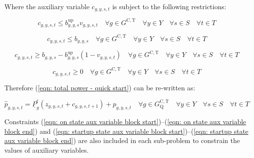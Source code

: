 \documentclass{article}
\newcommand{\sGeneratorsCandidateThermal}{G^{\mathrm{C,T}}}
\newcommand{\sYears}{Y}
\newcommand{\sScenarios}{S}
\newcommand{\sIntervals}{T}
\newcommand{\sGeneratorsCandidateThermalQuickStart}{G^{\mathrm{C,T}}_\mathrm{Q}}
\newcommand{\iGenerator}{g}
\newcommand{\iYear}{y}
\newcommand{\iScenario}{s}
\newcommand{\iInterval}{t}
\newcommand{\cPowerOutputMin}[1][\iGenerator]{\underline{P}_{#1}}
\newcommand{\cPowerOutputMinProportion}{\cPowerOutputMin^{\mathrm{f}}}
\newcommand{\vStartupIndicator}[1][\iGenerator,\iYear,\iScenario,\iInterval]{v_{#1}}
\newcommand{\vPower}[1][\iGenerator,\iYear,\iScenario,\iInterval]{p_{#1}}
\newcommand{\vPowerTotal}[1][\iGenerator,\iYear,\iScenario,\iInterval]{\hat{p}_{#1}}
\newcommand{\vInstalledCapacityTotalScenario}[1][\iGenerator,\iYear,\iScenario]{b_{#1}}
\newcommand{\vInstalledCapacityOnStateAux}[1][\iGenerator,\iYear,\iScenario,\iInterval]{z_{#1}}
\newcommand{\vInstalledCapacityStartupStateAux}[1][\iGenerator,\iYear,\iScenario,\iInterval]{c_{#1}}
\begin{document}
Where the auxiliary variable $\vInstalledCapacityStartupStateAux$ is subject to the following restrictions:

\begin{equation}
	\vInstalledCapacityStartupStateAux \leq \vInstalledCapacityTotalScenario^{\mathrm{up}} \vStartupIndicator \quad \forall \iGenerator \in \sGeneratorsCandidateThermal \quad \forall \iYear \in \sYears \quad \forall \iScenario \in \sScenarios \quad \forall \iInterval \in \sIntervals
	\label{eqn: startup state aux variable block start}
\end{equation}

\begin{equation}
	\vInstalledCapacityStartupStateAux \leq \vInstalledCapacityTotalScenario \quad \forall \iGenerator \in \sGeneratorsCandidateThermal \quad \forall \iYear \in \sYears \quad \forall \iScenario \in \sScenarios \quad \forall \iInterval \in \sIntervals
\end{equation}

\begin{equation}
	\vInstalledCapacityStartupStateAux \geq \vInstalledCapacityTotalScenario - \vInstalledCapacityTotalScenario^{\mathrm{up}} \left(1 - \vStartupIndicator \right) \quad \forall \iGenerator \in \sGeneratorsCandidateThermal \quad \forall \iYear \in \sYears \quad \forall \iScenario \in \sScenarios \quad \forall \iInterval \in \sIntervals
\end{equation}

\begin{equation}
	\vInstalledCapacityStartupStateAux \geq 0 \quad \forall \iGenerator \in \sGeneratorsCandidateThermal \quad \forall \iYear \in \sYears \quad \forall \iScenario \in \sScenarios \quad \forall \iInterval \in \sIntervals
	\label{eqn: startup state aux variable block end}
\end{equation}

Therefore (\ref{eqn: total power - quick start}) can be re-written as:

\begin{equation}
	\vPowerTotal = \cPowerOutputMinProportion \left(\vInstalledCapacityOnStateAux + \vInstalledCapacityStartupStateAux[\iGenerator,\iYear,\iScenario,\iInterval+1]\right) + \vPower \quad \forall \iGenerator \in \sGeneratorsCandidateThermalQuickStart \quad \forall \iYear \in \sYears \quad \forall \iScenario \in \sScenarios \quad \forall \iInterval \in \sIntervals
\end{equation}

Constraints (\ref{eqn: on state aux variable block start})--(\ref{eqn: on state aux variable block end}) and (\ref{eqn: startup state aux variable block start})--(\ref{eqn: startup state aux variable block end}) are also included in each sub-problem to constrain the values of auxiliary variables.
\end{document}

